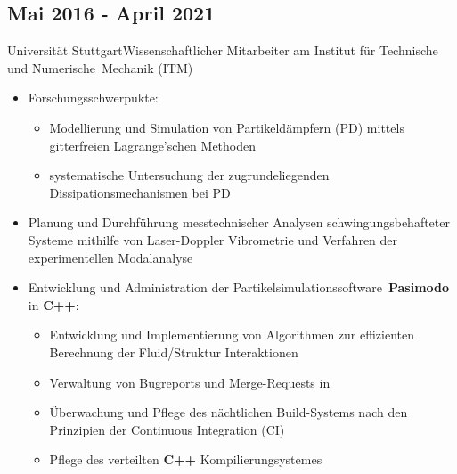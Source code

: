 \documentclass{mycv}
\begin{document}
\begin{paracol}{2}
\subsection{Mai 2016 - April 2021}{Universit{\"a}t
Stuttgart}{Wissenschaftlicher Mitarbeiter am Institut f{\"u}r
Technische und Numerische \,Mechanik (ITM)}
	  \begin{itemize}
			\item Forschungsschwerpukte: 
				\begin{itemize}
					\item Modellierung und Simulation von Partikeld{\"a}mpfern (PD) mittels
						gitterfreien Lagrange\-'schen Methoden
			    \item systematische Untersuchung der zugrundeliegenden
			    	Dissipationsmechanismen bei PD 
		\end{itemize}
			\item Planung und Durchf{\"u}hrung messtechnischer Analysen
				schwingungsbehafteter Systeme mithilfe von Laser-Doppler Vibrometrie
				und Verfahren der experimentellen Modalanalyse
			\item Entwicklung und Administration der Partikelsimulationssoftware
			{\bfseries \,Pasimodo} in {\bfseries C++}:
			\begin{itemize}
				\item Entwicklung und Implementierung von Algorithmen zur effizienten
					Berechnung der Fluid/Struktur Interaktionen 
				\item Verwaltung von Bugreports und Merge-Requests in
					\href{https://about.gitlab.com/}{}
				\item Überwachung und Pflege des nächtlichen Build-Systems nach
					den Prinzipien der Continuous Integration (CI)
				\item Pflege des verteilten {\bfseries C++} Kompilierungsystemes

\end{itemize}
\end{itemize}
\end{paracol}
\end{document}

